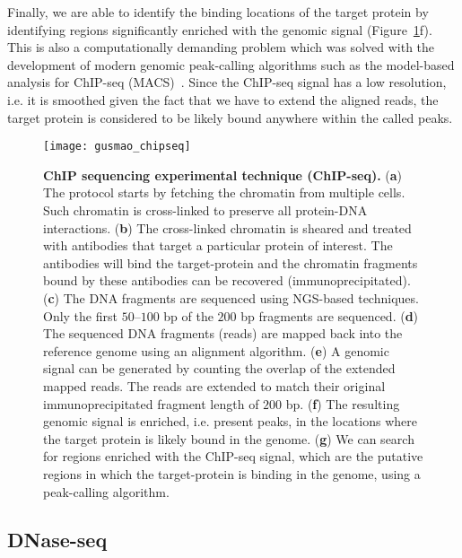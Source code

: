 Finally, we are able to identify the binding locations of the target protein by identifying regions significantly enriched with the genomic signal (Figure~\ref{fig:gusmao_chipseq}f). This is also a computationally demanding problem which was solved with the development of modern genomic peak-calling algorithms such as the model-based analysis for ChIP-seq (MACS)~\cite{zhang2008}. Since the ChIP-seq signal has a low resolution, i.e. it is smoothed given the fact that we have to extend the aligned reads, the target protein is considered to be likely bound anywhere within the called peaks.

\begin{figure}[h!]
\centering
\texttt{[image: gusmao\_chipseq]}
\caption[ChIP sequencing experimental technique (ChIP-seq)]{\textbf{ChIP sequencing experimental technique (ChIP-seq).} (\textbf{a}) The protocol starts by fetching the chromatin from multiple cells. Such chromatin is cross-linked to preserve all protein-DNA interactions. (\textbf{b}) The cross-linked chromatin is sheared and treated with antibodies that target a particular protein of interest. The antibodies will bind the target-protein and the chromatin fragments bound by these antibodies can be recovered (immunoprecipitated). (\textbf{c}) The DNA fragments are sequenced using NGS-based techniques. Only the first $50$--$100$ bp of the \approxy$200$ bp fragments are sequenced. (\textbf{d}) The sequenced DNA fragments (reads) are mapped back into the reference genome using an alignment algorithm. (\textbf{e}) A genomic signal can be generated by counting the overlap of the extended mapped reads. The reads are extended to match their original immunoprecipitated fragment length of \approxy$200$ bp. (\textbf{f}) The resulting genomic signal is enriched, i.e. present peaks, in the locations where the target protein is likely bound in the genome. (\textbf{g}) We can search for regions enriched with the ChIP-seq signal, which are the putative regions in which the target-protein is binding in the genome, using a peak-calling algorithm.}
\label{fig:gusmao_chipseq}
\end{figure}

\subsection{DNase-seq}
\label{sec:dnase.seq}

